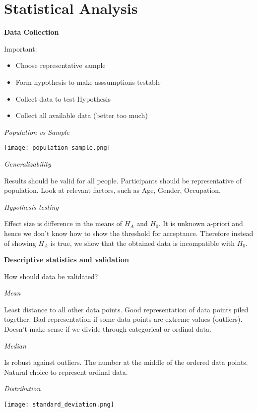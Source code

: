 \section{Statistical Analysis}

\textbf{Data Collection}

Important:
\begin{itemize}
    \item Choose representative sample
    \item Form hypothesis to make asssumptions testable
    \item Collect data to test Hypothesis
    \item Collect all available data (better too much)
\end{itemize}
\textit{Population vs Sample}


\begin{center}
	\texttt{[image: population\_sample.png]}
\end{center}


\textit{Generalizability} \smallskip

Results should be valid for all people. Participants should be representative of population. Look at relevant factors, such as Age, Gender, Occupation. \medskip

\textit{Hypothesis testing}  \smallskip

Effect size is difference in the means of $H_A$ and $H_0$. It is unknown a-priori and hence we don't know how to show the threshold for acceptance. 
Therefore instead of showing $H_A$ is true, we show that the obtained data is incompatible with $H_0$. \bigskip

\textbf{Descriptive statistics and validation}  \smallskip

How should data be validated? \medskip

\textit{Mean}  \smallskip

Least distance to all other data points. Good representation of data points piled together. Bad representation if some data points are extreme values (outliers).
Doesn't make sense if we divide through categorical or ordinal data. \medskip

\textit{Median}  \smallskip

Is robust against outliers. The number at the middle of the ordered data points. Natural choice to represent ordinal data. \medskip

\textit{Distribution} \smallskip


\begin{center}
	\texttt{[image: standard\_deviation.png]}
\end{center}


